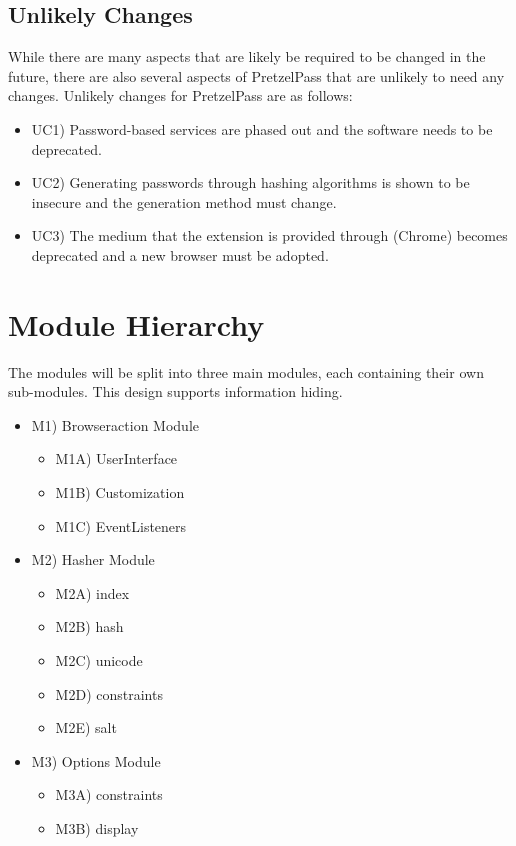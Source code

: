 \documentclass[12pt]{article}
\begin{document}
\subsection{Unlikely Changes}
While there are many aspects that are likely be required to be changed in the future, there are also several aspects of PretzelPass that are unlikely to need any changes.  Unlikely changes for PretzelPass are as follows:
\begin{itemize}
\item UC1) Password-based services are phased out and the software needs to be deprecated.
\item UC2) Generating passwords through hashing algorithms is shown to be insecure and the generation method must change.
\item UC3) The medium that the extension is provided through (Chrome) becomes deprecated and a new browser must be adopted. 
\end{itemize}

\newpage
\section{Module Hierarchy}
The modules will be split into three main modules, each containing their own sub-modules.  This design supports information hiding.

\begin{itemize}
\item M1) Browseraction Module
\begin{itemize}
\item M1A) UserInterface
\item M1B) Customization
\item M1C) EventListeners
\end{itemize}
\item M2) Hasher Module
\begin{itemize}
\item M2A) index
\item M2B) hash
\item M2C) unicode
\item M2D) constraints
\item M2E) salt
\end{itemize}
\item M3) Options Module
\begin{itemize}
\item M3A) constraints
\item M3B) display
\end{itemize}
\end{itemize}
\end{document}
